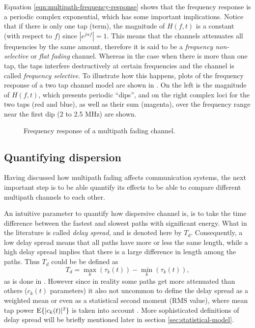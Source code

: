 Equation \eqref{eqn:multipath-frequency-response} shows that the frequency response is a periodic complex exponential, which has some important implications. Notice that if there is only one tap (term), the magnitude of \(H(f, t)\) is a constant (with respect to \(f\)) since \(|e^{j\alpha f}| = 1\). This means that the channels attenuates all frequencies by the same amount, therefore it is said to be a \emph{frequency non-selective} or \emph{flat fading} channel. Whereas in the case when there is more than one tap, the taps interfere destructively at certain frequencies and the channel is called \emph{frequency selective}. To illustrate how this happens, plots of the frequency response of a two tap channel model are shown in . On the left is the magnitude of \(H(f, t)\), which presents periodic ``dips'', and on the right complex loci for the two taps (red and blue), as well as their sum (magenta), over the frequency range near the first dip (2 to 2.5 MHz) are shown.


\begin{figure}
	\centering
	\resizebox{\linewidth}{!}{
		
	}
	\caption{
		Frequency response of a multipath fading channel.
		\label{fig:multipath-frequency-response-plots}
	}
\end{figure}

\subsection{Quantifying dispersion}

Having discussed how multipath fading affects communication systems, the next important step is to be able quantify its effects to be able to compare different multipath channels to each other.

An intuitive parameter to quantify how dispersive channel is, is to take the time difference between the fastest and slowest paths with significant energy. What in the literature is called \emph{delay spread}, and is denoted here by \(T_d\). Consequently, a low delay spread means that all paths have more or less the same length, while a high delay spread implies that there is a large difference in length among the paths. Thus \(T_d\) could be be defined as
\begin{equation}
	T_d = \max_{k} (\tau_k(t)) -  \min_{k} (\tau_k(t)),
\end{equation}
as is done in \cite{Gallager}. However since in reality some paths get more attenuated than others (\(c_k(t)\) parameters) it also not uncommon to define the delay spread as a weighted mean or even as a statistical second moment (RMS value), where mean tap power \(\operatorname{E}\{|c_k(t)|^2\}\) is taken into account \cite{Mathis,Messier}. More sophisticated definitions of delay spread will be briefly mentioned later in section \ref{sec:statistical-model}.

